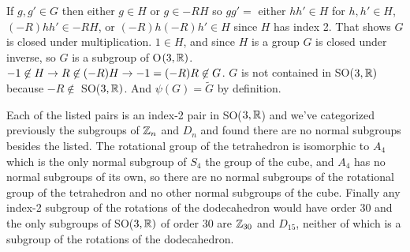 \documentclass[11pt, oneside]{article}   	%
\begin{document}
\item If $g, g' \in G$ then either $g \in H$ or $g \in -RH$ so $gg' = $ either $hh' \in H$ for $h, h' \in H$, $(-R)hh' \in -RH$, or $(-R)h(-R)h' \in H$ since $H$ has index 2. That shows $G$ is closed under multiplication. $1 \in H$, and since $H$ is a group $G$ is closed under inverse, so $G$ is a subgroup of O$(3, \mathbb{R})$. $-1 \not \in H \rightarrow R \not \in (-R)H \rightarrow -1 = (-R)R \not \in G$. $G$ is not contained in SO($3, \mathbb{R})$ because $-R \not \in$ SO($3, \mathbb{R})$. And $\psi(G) = \tilde{G}$ by definition.
\item Each of the listed pairs is an index-2 pair in SO($3, \mathbb{R}$) and we've categorized previously the subgroups of $\mathbb{Z}_n$ and $D_n$ and found there are no normal subgroups besides the listed. The rotational group of the tetrahedron is isomorphic to $A_4$ which is the only normal subgroup of $S_4$ the group of the cube, and $A_4$ has no normal subgroups of its own, so there are no normal subgroups of the rotational group of the tetrahedron and no other normal subgroups of the cube. Finally any index-2 subgroup of the rotations of the dodecahedron would have order 30 and the only subgroups of SO($3, \mathbb{R})$ of order 30 are $\mathbb{Z}_{30}$ and $D_{15}$, neither of which is a subgroup of the rotations of the dodecahedron.
\ee
\ee
\end{document}
